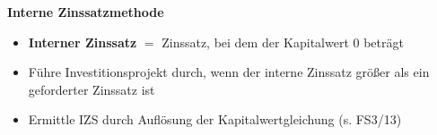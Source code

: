 \bigskip
\textbf{Interne Zinssatzmethode}
\begin{itemize}
	\item \textbf{Interner Zinssatz} $=$ Zinssatz, bei dem der Kapitalwert $0$ beträgt
	\item Führe Investitionsprojekt durch, wenn der interne Zinssatz größer als ein geforderter Zinssatz ist
	\item Ermittle IZS durch Auflösung der Kapitalwertgleichung (s. FS3/13)
\end{itemize}